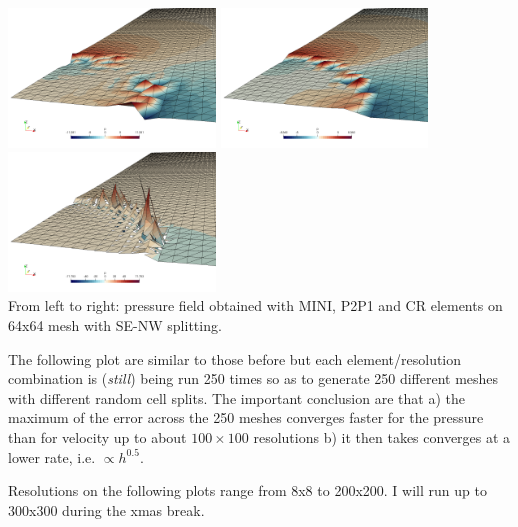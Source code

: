 \begin{center}
\includegraphics[width=5.5cm]{python_codes/fieldstone_112/results/exp5_tridiag/64x64_tridiag1/MINI}
\includegraphics[width=5.5cm]{python_codes/fieldstone_112/results/exp5_tridiag/64x64_tridiag1/P2P1}
\includegraphics[width=5.5cm]{python_codes/fieldstone_112/results/exp5_tridiag/64x64_tridiag1/CR}\\
{\captionfont From left to right: pressure field obtained with MINI, P2P1 and CR elements on 64x64 mesh
with SE-NW splitting.}
\end{center}



\newpage
The following plot are similar to those before but each element/resolution combination is (\textit{still}) being run 
250 times so as to generate 250 different meshes with different random cell splits. The important conclusion
are that a) the maximum of the error across the 250 meshes converges faster for the pressure than for velocity
up to about $100\times 100$ resolutions b) it then takes converges at a lower rate, i.e. $\propto h^{0.5}$. 

Resolutions on the following plots range from 8x8 to 200x200. I will run up to 300x300 during the xmas break.

